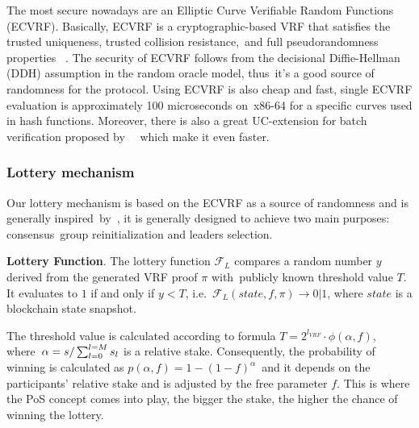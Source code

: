 The most secure nowadays are an Elliptic Curve Verifiable Random Functions (ECVRF).
Basically, ECVRF is a cryptographic-based VRF that satisfies the trusted uniqueness, trusted collision resistance,\
and full pseudorandomness properties ~\cite{cryptoeprint:2014/905}.
The security of ECVRF follows from the decisional Diffie-Hellman (DDH) assumption in the random oracle model, thus\
it's a good source of randomness for the protocol.
Using ECVRF is also cheap and fast, single ECVRF evaluation is approximately 100 microseconds on\
x86-64 for a specific curves used in hash functions.
Moreover, there is also a great UC-extension for batch verification proposed by ~\cite{cryptoeprint:2022/1045}\
which make it even faster.

\subsubsection{Lottery mechanism}
Our lottery mechanism is based on the ECVRF as a source of randomness and is generally inspired\
by~\cite{cryptoeprint:2017/573}, it is generally designed to achieve two main purposes: consensus\
group reinitialization and leaders selection.

\textbf{Lottery Function}.
The lottery function ${\mathcal{F}}_{L}$ compares a random number $y$ derived from the generated VRF proof $\pi$ with\
publicly known threshold value $T$.
It evaluates to $1$ if and only if ${y < T}$, i.e.\
${\mathcal{F}}_{L}(state, f, \pi) \rightarrow 0|1$, where $state$ is a blockchain state snapshot.

The threshold value is calculated according to formula ${T = 2^{l_{VRF}}\cdot \phi(\alpha, f)}$, where\
${\alpha=s/\\\sum_{l=0}^{l=M} s_l}$ is a relative stake.
Consequently, the probability of winning is calculated as ${p(\alpha, f) = 1-(1-f)^{\alpha}}$\
and it depends on the participants' relative stake and is adjusted by the free parameter $f$.
This is where the PoS concept comes into play, the bigger the stake, the higher the chance of winning the lottery.

